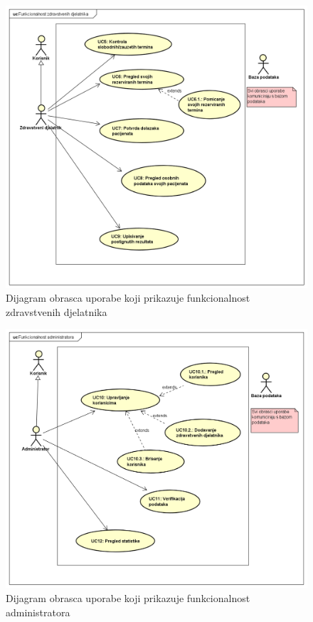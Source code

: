 					\begin{figure}[H]
						\includegraphics[scale=0.6]{slike/ZdravstveniDjelatnik.PNG} %
						\centering
						\caption{Dijagram obrasca uporabe koji prikazuje funkcionalnost zdravstvenih djelatnika}
						\label{fig:promjene}
					\end{figure}
					
					\begin{figure}[H]
						\includegraphics[scale=0.6]{slike/Administrator.PNG} %
						\centering
						\caption{Dijagram obrasca uporabe koji prikazuje funkcionalnost administratora}
						\label{fig:promjene}
					\end{figure}
				
